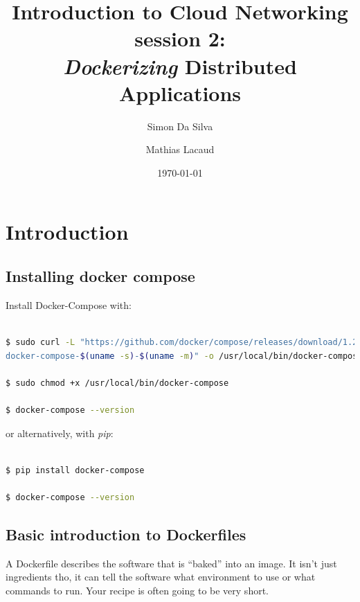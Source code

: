 \documentclass[a4paper,11pt]{exam}
\date{\today}
\title{Introduction to Cloud Networking session 2: \\
\textit{Dockerizing} Distributed Applications}
\author{Simon Da Silva \and Mathias Lacaud}
\begin{document}
	
		
	
\maketitle


\section{Introduction}
\subsection{Installing docker compose}
Install Docker-Compose with:

\begin{lstlisting}[frame=single,language={sh}]  % Start your code-block

$ sudo curl -L "https://github.com/docker/compose/releases/download/1.22.0/
docker-compose-$(uname -s)-$(uname -m)" -o /usr/local/bin/docker-compose

$ sudo chmod +x /usr/local/bin/docker-compose

$ docker-compose --version
\end{lstlisting}

or alternatively, with \textit{pip}: 

\begin{lstlisting}[frame=single,language={sh}]  % Start your code-block

$ pip install docker-compose

$ docker-compose --version
\end{lstlisting}


\subsection{Basic introduction to Dockerfiles}

A Dockerfile describes the software that is “baked” into an image. It isn’t just ingredients tho, it can tell the software what environment to use or what commands to run. Your recipe is often going to be very short.
\end{document}
